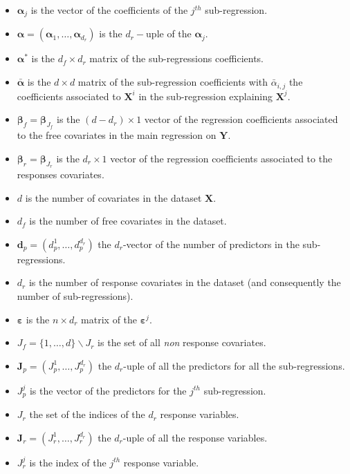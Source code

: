 \documentclass[12pt,a4paper]{report}
\begin{document}
\begin{itemize}
	\item $\boldsymbol{\alpha}_j$ is the vector of the coefficients of the $j^{th}$ sub-regression.
	\item $\boldsymbol{\alpha}=(\boldsymbol{\alpha}_1,\dots,\boldsymbol{\alpha}_{d_r})$ is the $d_r-$uple of the $\boldsymbol{\alpha}_j$.
	\item $\boldsymbol{\alpha}^*$ is the $d_f \times d_r $ matrix of the sub-regressions coefficients.
	\item $\bar{\boldsymbol{\alpha}}$ is the $d\times d$ matrix of the sub-regression coefficients with $\bar{\alpha}_{i,j}$ the coefficients associated to $\boldsymbol{X}^i$ in the sub-regression explaining $\boldsymbol{X}^j$.
	\item $\boldsymbol{\beta}_f=\boldsymbol{\beta}_{J_f}$ is the $(d-d_r)\times 1$ vector of the regression coefficients associated  to the free covariates in the main regression on $\boldsymbol{Y}$.
	\item $\boldsymbol{\beta}_r=\boldsymbol{\beta}_{J_r}$ is the $d_r\times 1$ vector of the regression coefficients associated  to the responses covariates.
	\item $d$ is the number of covariates in the dataset $\boldsymbol{X}$.
	\item $d_f$ is the number of free covariates in the dataset.
	\item $\boldsymbol{d}_p=(d_p^1,\ldots,d_p^{d_{r}})$ the $d_r$-vector of the number of predictors in the sub-regressions.
	\item $d_r$ is the number of response covariates in the dataset (and consequently the number of sub-regressions).
	\item $\boldsymbol{\varepsilon}$ is the $n\times d_r$ matrix of the $\boldsymbol{\varepsilon}^j$.
	\item $J_f=\{1,\ldots,d\} \backslash J_{r}$ is the set of all {\it non} response covariates.
	\item $\boldsymbol{J}_p=(J_{p}^1,\ldots,J_p^{d_r})$ the $d_r$-uple of all the predictors for all the sub-regressions.
	\item $J_p^j$ is the vector of the predictors for the $j^{th}$ sub-regression.
	\item $J_r$ the set of the indices of the $d_r$ response variables.
	\item $\boldsymbol{J}_r=(J_{r}^1,\ldots,J_r^{d_r})$ the $d_r$-uple of all the response variables.
	\item $J_{r}^j$ is the index of the $j^{th}$ response variable.

\end{itemize}
\end{document}
